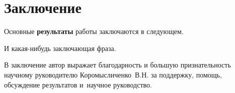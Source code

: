 \chapter*{Заключение}                       %

Основные \textbf{результаты} работы заключаются в следующем.

И какая-нибудь заключающая фраза.

В заключение автор выражает благодарность и большую признательность научному руководителю
Коромысличенко~В.\:Н. за поддержку, помощь, обсуждение результатов и~научное руководство.
